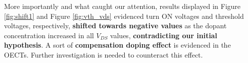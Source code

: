 More importantly and what caught our attention, results displayed in Figure \ref{fig:shift1} and Figure \ref{fig:vth_vds} evidenced turn ON voltages and threshold voltages, respectively, \textbf{shifted towards negative values} as the dopant concentration increased in all $V_{DS}$ values, \textbf{contradicting our initial hypothesis}. A sort of \textbf{compensation doping effect} is evidenced in the OECTs. Further investigation is needed to counteract this effect. %

\begin{figure}[ht]
    \centering
    \qquad

\end{figure}
